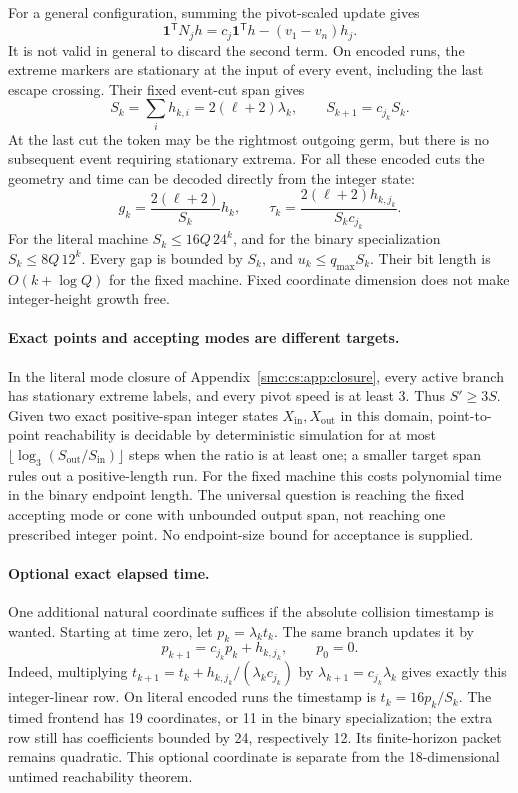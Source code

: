 \documentclass[11pt,letterpaper]{article}
\numberwithin{equation}{section}
\theoremstyle{definition}
\theoremstyle{remark}
\newcommand{\one}{\mathbf 1}\newcommand{\set}[1]{\{#1\}}
\begin{document}
For a general configuration, summing the pivot-scaled update gives
\[
 \one^{\mathsf T}N_jh=c_j\one^{\mathsf T}h-(v_1-v_n)h_j.
\]
It is not valid in general to discard the second term. On encoded runs, the extreme markers are stationary at the input of every event, including the last escape crossing. Their fixed event-cut span gives
\[
 S_k=\sum_i h_{k,i}=2(\ell+2)\lambda_k,
 \qquad S_{k+1}=c_{j_k}S_k.
\]
At the last cut the token may be the rightmost outgoing germ, but there is no subsequent event requiring stationary extrema. For all these encoded cuts the geometry and time can be decoded directly from the integer state:
\[
 g_k=\frac{2(\ell+2)}{S_k}h_k,
 \qquad \tau_k=\frac{2(\ell+2)h_{k,j_k}}{S_kc_{j_k}}.
\]
For the literal machine $S_k\le16Q\,24^k$, and for the binary specialization $S_k\le8Q\,12^k$. Every gap is bounded by $S_k$, and $u_k\le q_{\max}S_k$. Their bit length is $O(k+\log Q)$ for the fixed machine. Fixed coordinate dimension does not make integer-height growth free.

\paragraph{Exact points and accepting modes are different targets.}
In the literal mode closure of Appendix~\ref{smc:cs:app:closure}, every active branch has stationary extreme labels, and every pivot speed is at least 3. Thus $S'\ge3S$. Given two exact positive-span integer states $X_{\mathrm{in}},X_{\mathrm{out}}$ in this domain, point-to-point reachability is decidable by deterministic simulation for at most $\lfloor\log_3(S_{\mathrm{out}}/S_{\mathrm{in}})\rfloor$ steps when the ratio is at least one; a smaller target span rules out a positive-length run. For the fixed machine this costs polynomial time in the binary endpoint length. The universal question is reaching the fixed accepting mode or cone with unbounded output span, not reaching one prescribed integer point. No endpoint-size bound for acceptance is supplied.

\paragraph{Optional exact elapsed time.}
One additional natural coordinate suffices if the absolute collision timestamp is wanted. Starting at time zero, let $p_k=\lambda_k t_k$. The same branch updates it by
\[
 p_{k+1}=c_{j_k}p_k+h_{k,j_k},\qquad p_0=0.
\]
Indeed, multiplying $t_{k+1}=t_k+h_{k,j_k}/(\lambda_k c_{j_k})$ by $\lambda_{k+1}=c_{j_k}\lambda_k$ gives exactly this integer-linear row. On literal encoded runs the timestamp is $t_k=16p_k/S_k$. The timed frontend has 19 coordinates, or 11 in the binary specialization; the extra row still has coefficients bounded by 24, respectively 12. Its finite-horizon packet remains quadratic. This optional coordinate is separate from the 18-dimensional untimed reachability theorem.
\end{document}
